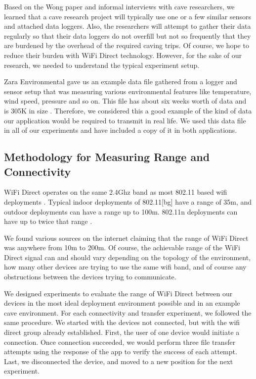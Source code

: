 \documentclass[10pt,twocolumn]{article}
\begin{document}
Based on the Wong paper and informal interviews with cave researchers, we learned that a cave research project will typically use one or a few similar sensors and attached data loggers.
Also, the researchers will attempt to gather their data regularly so that their data loggers do not overfill but not so frequently that they are burdened by the overhead of the required caving trips.
Of course, we hope to reduce their burden with WiFi Direct technology.
However, for the sake of our research, we needed to understand the typical experiment setup.

Zara Environmental gave us an example data file gathered from a logger and sensor setup that was measuring various environmental features like temperature, wind speed, pressure and so on.
This file has about six weeks worth of data and is 305K in size \cite{datafile}.
Therefore, we considered this a good example of the kind of data our application would be required to transmit in real life.
We used this data file in all of our experiments and have included a copy of it in both applications.

\subsection{Methodology for Measuring Range and Connectivity}
\label{sec:Methodology}
WiFi Direct operates on the same 2.4Ghz band as most 802.11 based wifi deployments \cite{wifiwhitepaper}.
Typical indoor deployments of 802.11[bg] have a range of 35m, and outdoor deployments can have a range up to 100m.
802.11n deployments can have up to twice that range \cite{wikiwifi}.

We found various sources on the internet claiming that the range of WiFi Direct was anywhere from 10m to 200m. 
Of course, the achievable range of the WiFi Direct signal can and should vary depending on the topology of the environment, how many other devices are trying to use the same wifi band, and of course any obstructions between the devices trying to communicate.

We designed experiments to evaluate the range of WiFi Direct between our devices in the most ideal deployment environment possible and in an example cave environment.
For each connectivity and transfer experiment, we followed the same procedure. 
We started with the devices not connected, but with the wifi direct group already established.
First, the user of one device would initiate a connection.
Once connection succeeded, we would perform three file transfer attempts using the response of the app to verify the success of each attempt.
Last, we disconnected the device, and moved to a new position for the next experiment.
\end{document}
